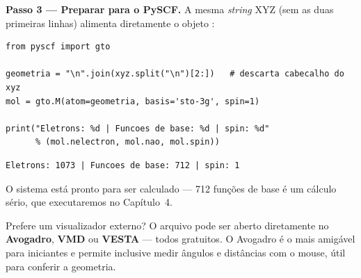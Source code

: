 \begin{caixamaos}
\vspace{0.3cm}
\textbf{Passo 3 --- Preparar para o PySCF.} A mesma \emph{string} XYZ (sem as duas
primeiras linhas) alimenta diretamente o objeto :

\begin{lstlisting}[style=python]
from pyscf import gto

geometria = "\n".join(xyz.split("\n")[2:])   # descarta cabecalho do xyz
mol = gto.M(atom=geometria, basis='sto-3g', spin=1)

print("Eletrons: %d | Funcoes de base: %d | spin: %d"
      % (mol.nelectron, mol.nao, mol.spin))
\end{lstlisting}

\begin{lstlisting}[style=console]
Eletrons: 1073 | Funcoes de base: 712 | spin: 1
\end{lstlisting}

O sistema está pronto para ser calculado --- 712 funções de base é um cálculo
sério, que executaremos no Capítulo~4.
\end{caixamaos}

\begin{caixadica}
Prefere um visualizador externo? O arquivo  pode ser aberto
diretamente no \textbf{Avogadro}, \textbf{VMD} ou \textbf{VESTA} --- todos
gratuitos. O Avogadro é o mais amigável para iniciantes e permite inclusive
medir ângulos e distâncias com o mouse, útil para conferir a geometria.
\end{caixadica}

